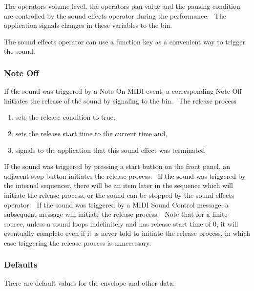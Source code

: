 \documentclass[letterpaper]{article}
\newcommand\liststyleLxiii{%
\renewcommand\theenumi{\arabic{enumi}}
\renewcommand\theenumii{\alph{enumii}}
\renewcommand\labelenumi{ \theenumi.}
\renewcommand\labelenumii{ \theenumii)}
\renewcommand\labelitemi{•}
\renewcommand\labelitemii{•}
}
\begin{document}
The operator{\textquotesingle}s volume level, the
operator{\textquotesingle}s pan value and the pausing condition are
controlled by the sound effects operator during the performance. \ The
application signals changes in these variables to the bin. 

The sound effects operator can use a function key as a convenient way to
trigger the sound.

\subsubsection{Note Off}
If the sound was triggered by a Note On MIDI event, a corresponding Note
Off initiates the release of the sound by signaling to the bin. \ The
release process

\liststyleLxiii
\begin{enumerate}
\item sets the release condition to true, 
\item sets the release start time to the current time and, 
\item signals to the application that this sound effect was terminated
\ 
\end{enumerate}
If the sound was triggered by pressing a start button on the front
panel, an adjacent stop button initiates the release process. \ If the
sound was triggered by the internal sequencer, there will be an item
later in the sequence which will initiate the release process, or the
sound can be stopped by the sound effects operator. \ If the sound was
triggered by a MIDI Sound Control message, a subsequent message will
initiate the release process. \ Note that for a finite source, unless a
sound loops indefinitely and has release start time of 0, it will
eventually complete even if it is never told to initiate the release
process, in which case triggering the release process is unnecessary.

\subsubsection{Defaults}
There are default values for the envelope and other data:
\end{document}
